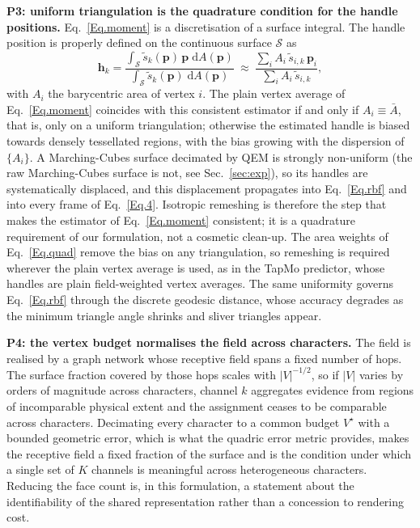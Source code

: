 \documentclass[lettersize,journal]{IEEEtran}
\newcommand{\rev}[1]{{\color{red}#1}}
\begin{document}
\textbf{P3: uniform triangulation is the quadrature condition for the handle positions.}
Eq.~\ref{Eq.moment} is a discretisation of a surface integral. The handle position is properly
defined on the continuous surface $\mathcal{S}$ as
\begin{equation} \label{Eq.quad}
\bm{h}_{k}=
\frac{\int_{\mathcal{S}}\tilde{s}_{k}(\bm{p})\,\bm{p}\;\mathrm{d}A(\bm{p})}
{\int_{\mathcal{S}}\tilde{s}_{k}(\bm{p})\;\mathrm{d}A(\bm{p})}
\ \approx\
\frac{\sum_{i}A_{i}\,\tilde{s}_{i,k}\,\bm{p}_{i}}{\sum_{i}A_{i}\,\tilde{s}_{i,k}},
\end{equation}
with $A_{i}$ the barycentric area of vertex $i$. The plain vertex average of
Eq.~\ref{Eq.moment} coincides with this consistent estimator if and only if
$A_{i}\equiv\bar{A}$, that is, only on a uniform triangulation; otherwise the estimated handle
is biased towards densely tessellated regions, with the bias growing with the dispersion of
$\{A_{i}\}$. \rev{A Marching-Cubes surface decimated by QEM is strongly non-uniform (the raw
Marching-Cubes surface is not, see Sec.~\ref{sec:exp}),} so its handles are
systematically displaced, and this displacement propagates into Eq.~\ref{Eq.rbf} and into
every frame of Eq.~\ref{Eq.4}. Isotropic remeshing is therefore the step that makes the
estimator of Eq.~\ref{Eq.moment} consistent; it is a quadrature requirement of our
formulation, not a cosmetic clean-up. \rev{The area weights of Eq.~\ref{Eq.quad} remove the
bias on any triangulation, so remeshing is required wherever the plain vertex average is used,
as in the TapMo predictor, whose handles are plain field-weighted vertex averages.} The same uniformity governs Eq.~\ref{Eq.rbf} through the
discrete geodesic distance, whose accuracy degrades as the minimum triangle angle shrinks and
sliver triangles appear.

\textbf{P4: the vertex budget normalises the field across characters.} The field is realised
by a graph network whose receptive field spans a fixed number of hops. The surface fraction
covered by those hops scales with $|V|^{-1/2}$, so if $|V|$ varies by orders of magnitude
across characters, channel $k$ aggregates evidence from regions of incomparable physical
extent and the assignment ceases to be comparable across characters. Decimating every
character to a common budget $V^{\star}$ with a bounded geometric error, which is what the
quadric error metric provides, makes the receptive field a fixed fraction of the surface and
is the condition under which a single set of $K$ channels is meaningful across heterogeneous
characters. Reducing the face count is, in this formulation, a statement about the
identifiability of the shared representation rather than a concession to rendering cost.
\end{document}
